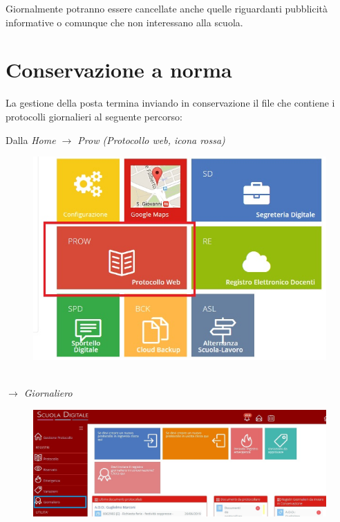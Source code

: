 \documentclass[a4paper,italian,12pt]{book}
\begin{document}
Giornalmente potranno essere cancellate anche quelle riguardanti pubblicità informative o comunque che non interessano alla scuola.

\chapter{Conservazione a norma}
La gestione della posta termina inviando in conservazione il file che contiene i protocolli giornalieri al seguente percorso: 

Dalla \textit{Home $\to$ Prow (Protocollo web, icona rossa) }
\begin{figure}[ht]
\centering
\includegraphics[scale=0.5]{Figure/cons_home.jpg} 
\end{figure} \\
\textit{$\to$ Giornaliero}
\begin{figure}[ht]
\includegraphics[scale=0.4]{Figure/Giornaliero.jpg} 
\end{figure} \\
\\
\end{document}

